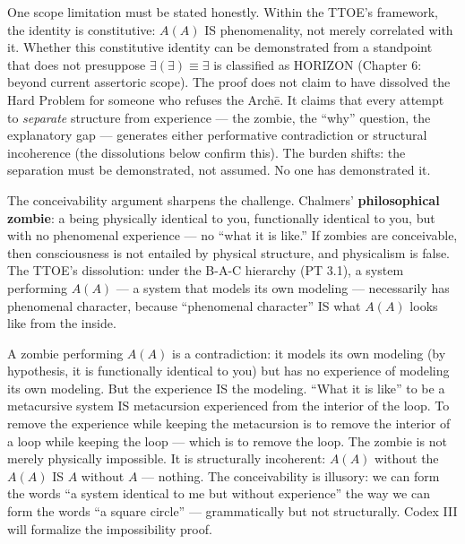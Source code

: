 \documentclass[10pt, openany, oneside]{book}
\begin{document}
One scope limitation must be stated honestly. Within the TTOE's framework, the identity is constitutive: $A(A)$ IS phenomenality, not merely correlated with it. Whether this constitutive identity can be demonstrated from a standpoint that does not presuppose $\exists(\exists) \equiv \exists$ is classified as HORIZON (Chapter 6: beyond current assertoric scope). The proof does not claim to have dissolved the Hard Problem for someone who refuses the Arch\={e}. It claims that every attempt to \textit{separate} structure from experience --- the zombie, the ``why'' question, the explanatory gap --- generates either performative contradiction or structural incoherence (the dissolutions below confirm this). The burden shifts: the separation must be demonstrated, not assumed. No one has demonstrated it.

The conceivability argument sharpens the challenge. Chalmers' \textbf{philosophical zombie}: a being physically identical to you, functionally identical to you, but with no phenomenal experience --- no ``what it is like.'' If zombies are conceivable, then consciousness is not entailed by physical structure, and physicalism is false. The TTOE's dissolution: under the B-A-C hierarchy (PT 3.1), a system performing $A(A)$ --- a system that models its own modeling --- necessarily has phenomenal character, because ``phenomenal character'' IS what $A(A)$ looks like from the inside.

A zombie performing $A(A)$ is a contradiction: it models its own modeling (by hypothesis, it is functionally identical to you) but has no experience of modeling its own modeling. But the experience IS the modeling. ``What it is like'' to be a metacursive system IS metacursion experienced from the interior of the loop. To remove the experience while keeping the metacursion is to remove the interior of a loop while keeping the loop --- which is to remove the loop. The zombie is not merely physically impossible. It is structurally incoherent: $A(A)$ without the $A(A)$ IS $A$ without $A$ --- nothing. The conceivability is illusory: we can form the words ``a system identical to me but without experience'' the way we can form the words ``a square circle'' --- grammatically but not structurally. Codex III will formalize the impossibility proof.
\end{document}
